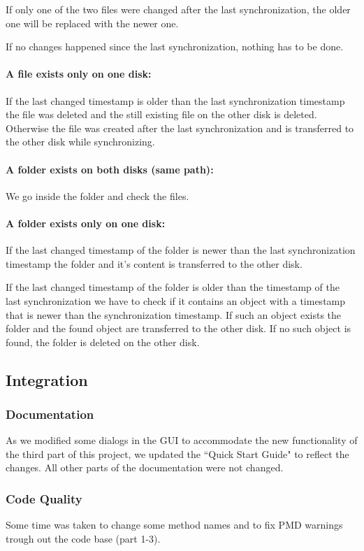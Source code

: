 \documentclass[a4paper,12pt]{article}
\begin{document}
If only one of the two files were changed after the last synchronization, the older one will be replaced with the newer one.

If no changes happened since the last synchronization, nothing has to be done.

\paragraph{A file exists only on one disk:} If the last changed timestamp is older than the last synchronization timestamp the file was deleted and the still existing file on the other disk is deleted. Otherwise the file was created after the last synchronization and is transferred to the other disk while synchronizing.

\paragraph{A folder exists on both disks (same path):} We go inside the folder and check the files.

\paragraph{A folder exists only on one disk:} If the last changed timestamp of the folder is newer than the last synchronization timestamp the folder and it's content is transferred to the other disk.

If the last changed timestamp of the folder is older than the timestamp of the last synchronization we have to check if it contains an object with a timestamp that is newer than the synchronization timestamp. If such an object exists the folder and the found object are transferred to the other disk. If no such object is found, the folder is deleted on the other disk.

\subsection{Integration}
\subsubsection{Documentation}
As we modified some dialogs in the GUI to accommodate the new functionality of the third part of this project, we updated the ``Quick Start Guide" to reflect the changes. All other parts of the documentation were not changed.

\subsubsection{Code Quality}
Some time was taken to change some method names and to fix PMD warnings trough out the code base (part 1-3).
\end{document}
